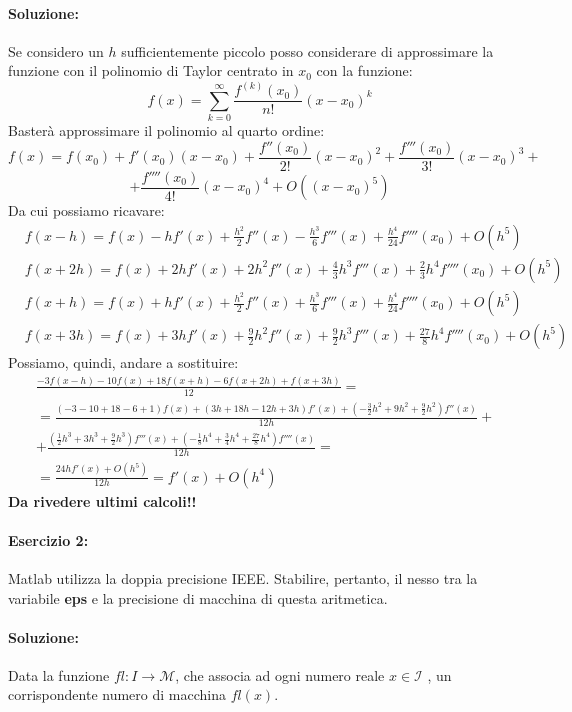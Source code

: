 \documentclass[12pt]{article}
\begin{document}
\paragraph{Soluzione:}
Se considero un \(h\) sufficientemente piccolo posso considerare di approssimare la funzione con il polinomio di Taylor
centrato in \(x_0\) con la funzione:
$$ f(x) = \sum_{k=0}^{\infty}{\frac{f^{(k)}(x_0)}{n!}(x-x_0)^k}$$
Basterà approssimare il polinomio al quarto ordine:
$$ f(x) = f(x_0) + f'(x_0)(x-x_0) + \frac{f''(x_0)}{2!}(x-x_0)^2+\frac{f'''(x_0)}{3!}(x-x_0)^3+$$
$$ + \frac{f''''(x_0)}{4!}(x-x_0)^4+O((x-x_0)^5)$$
Da cui possiamo ricavare:
\begin{equation}
    \begin{aligned}
        & f(x-h) = f(x) - hf'(x) + \frac{h^2}{2}f''(x)- \frac{h^3}{6}f'''(x)+ \frac{h^4}{24}f''''(x_0) + O(h^5)  \\
        & f(x+2h) = f(x) + 2hf'(x) + 2h^2f''(x)+ \frac{4}{3}h^3f'''(x)+ \frac{2}{3}h^4f''''(x_0) + O(h^5) \\
        & f(x+h) = f(x) + hf'(x) + \frac{h^2}{2}f''(x) + \frac{h^3}{6}f'''(x) + \frac{h^4}{24}f''''(x_0) + O(h^5)  \\
        & f(x+3h) = f(x) + 3hf'(x) + \frac{9}{2}h^2f''(x)+ \frac{9}{2}h^3f'''(x)+ \frac{27}{8}h^4f''''(x_0) + O(h^5)  
    \end{aligned}
\end{equation}
Possiamo, quindi, andare a sostituire:
\begin{equation}
    \begin{aligned}
        &\frac{-3f(x-h)-10f(x)+18f(x+h)-6f(x+2h)+f(x+3h)}{12}=\\
        &=\frac{(-3-10+18-6+1)f(x) + (3h+18h-12h+3h)f'(x)+(-\frac{3}{2}h^2+9h^2+\frac{9}{2}h^2)f''(x)}{12h}+ \\
        &+ \frac{(\frac{1}{2}h^3+ 3h^3 +\frac{9}{2}h^3)f'''(x) + (-\frac{1}{8}h^4+\frac{3}{4}h^4 +\frac{27}{8}h^4)f''''(x)}{12h}=\\
        &=\frac{24hf'(x) + O(h^5)}{12h} = f'(x)+O(h^4)
    \end{aligned}
\end{equation}
\textbf{Da rivedere ultimi calcoli!!}
\pagebreak
\paragraph{Esercizio 2:}
Matlab utilizza la doppia precisione IEEE. Stabilire, pertanto, il nesso tra la variabile
\textbf{eps} e la precisione di macchina di questa aritmetica.
\paragraph{Soluzione:}
Data la funzione \(fl: I \longrightarrow \mathcal{M}\), che associa ad ogni numero reale \(x \in \mathcal{I}\)
, un corrispondente numero di macchina \(fl(x)\). 
\end{document}
